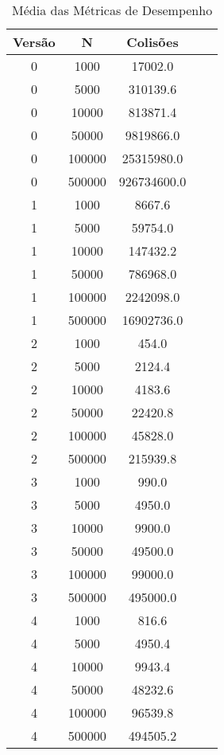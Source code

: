 \begin{table}[htbp]
\caption{Média das Métricas de Desempenho}
\label{tab:table4}
\begin{tabular}{c|c|c|c|c}
\textbf{Versão} & \textbf{N} & \textbf{Colisões}\\
\hline
0 & 1000 & 17002.0 \\
0 & 5000 & 310139.6 \\
0 & 10000 & 813871.4 \\
0 & 50000 & 9819866.0 \\
0 & 100000 & 25315980.0 \\
0 & 500000 & 926734600.0 \\
1 & 1000 & 8667.6 \\
1 & 5000 & 59754.0 \\
1 & 10000 & 147432.2 \\
1 & 50000 & 786968.0 \\
1 & 100000 & 2242098.0 \\
1 & 500000 & 16902736.0 \\
2 & 1000 & 454.0 \\
2 & 5000 & 2124.4 \\
2 & 10000 & 4183.6 \\
2 & 50000 & 22420.8 \\
2 & 100000 & 45828.0 \\
2 & 500000 & 215939.8 \\
3 & 1000 & 990.0 \\
3 & 5000 & 4950.0 \\
3 & 10000 & 9900.0 \\
3 & 50000 & 49500.0 \\
3 & 100000 & 99000.0 \\
3 & 500000 & 495000.0 \\
4 & 1000 & 816.6 \\
4 & 5000 & 4950.4 \\
4 & 10000 & 9943.4 \\
4 & 50000 & 48232.6 \\
4 & 100000 & 96539.8 \\
4 & 500000 & 494505.2 \\
\end{tabular}
\end{table}
